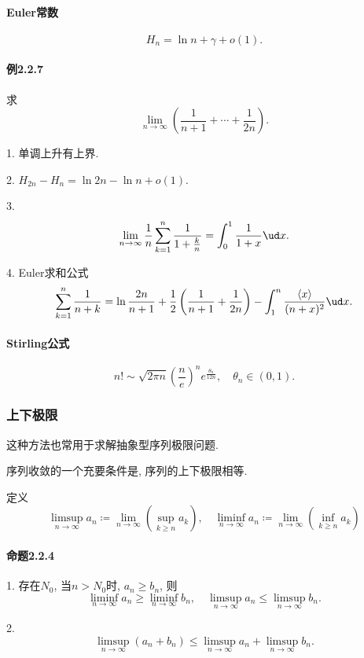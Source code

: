 \paragraph{Euler常数}

\[
H_{n}=\ln n+\gamma+o(1).
\]


\paragraph{例2.2.7}

求
\[
\lim_{n\to\infty}\left(\frac{1}{n+1}+\cdots+\frac{1}{2n}\right).
\]

1. 单调上升有上界.

2. $H_{2n}-H_{n}=\ln2n-\ln n+o(1)$.

3. 
\[
\lim_{n\to\infty}\frac{1}{n}\sum_{k=1}^{n}\frac{1}{1+\frac{k}{n}}=\int_{0}^{1}\frac{1}{1+x}\ud x.
\]

4. Euler求和公式
\[
\sum_{k=1}^{n}\frac{1}{n+k}=\ln\frac{2n}{n+1}+\frac{1}{2}\left(\frac{1}{n+1}+\frac{1}{2n}\right)-\int_{1}^{n}\frac{\left\langle x\right\rangle }{(n+x)^{2}}\ud x.
\]


\paragraph{Stirling公式}

\[
n!\sim\sqrt{2\pi n}\left(\frac{n}{e}\right)^{n}e^{\frac{\theta_{n}}{12n}},\quad\theta_{n}\in\left(0,1\right).
\]


\subsubsection{上下极限}

这种方法也常用于求解抽象型序列极限问题. 

序列收敛的一个充要条件是, 序列的上下极限相等.

定义
\[
\limsup_{n\to\infty}a_{n}\coloneqq\lim_{n\to\infty}\left(\sup_{k\ge n}a_{k}\right),\quad\liminf_{n\to\infty}a_{n}\coloneqq\lim_{n\to\infty}\left(\inf_{k\ge n}a_{k}\right)
\]


\paragraph{命题2.2.4}

1. 存在$N_{0}$, 当$n>N_{0}$时, $a_{n}\ge b_{n}$, 则
\[
\liminf_{n\to\infty}a_{n}\ge\liminf_{n\to\infty}b_{n},\quad\limsup_{n\to\infty}a_{n}\le\limsup_{n\to\infty}b_{n}.
\]

2. 
\[
\limsup_{n\to\infty}\left(a_{n}+b_{n}\right)\le\limsup_{n\to\infty}a_{n}+\limsup_{n\to\infty}b_{n}.
\]


